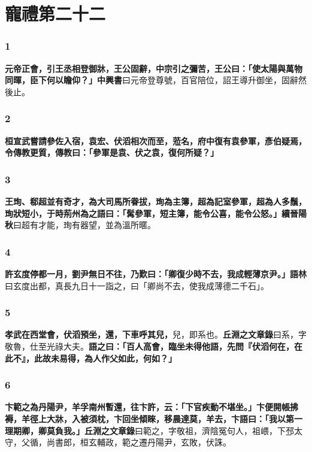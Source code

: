 \chapter{寵禮第二十二}

\subsection*{1}

\textbf{元帝正會，引王丞相登御牀，王公固辭，中宗引之彌苦，王公曰：「使太陽與萬物同暉，臣下何以瞻仰？」}{\footnotesize \textbf{中興書}曰元帝登尊號，百官陪位，詔王導升御坐，固辭然後止。}

\subsection*{2}

\textbf{桓宣武嘗請參佐入宿，袁宏、伏滔相次而至，蒞名，府中復有袁參軍，彥伯疑焉，令傳教更質，傳教曰：「參軍是袁、伏之袁，復何所疑？」}

\subsection*{3}

\textbf{王珣、郗超並有奇才，為大司馬所眷拔，珣為主簿，超為記室參軍，超為人多鬚，珣狀短小，于時荊州為之語曰：「髯參軍，短主簿，能令公喜，能令公怒。」}{\footnotesize \textbf{續晉陽秋}曰超有才能，珣有器望，並為溫所暱。}

\subsection*{4}

\textbf{許玄度停都一月，劉尹無日不往，乃歎曰：「卿復少時不去，我成輕薄京尹。」}{\footnotesize \textbf{語林}曰玄度出都，真長九日十一詣之，曰「卿尚不去，使我成薄德二千石」。}

\subsection*{5}

\textbf{孝武在西堂會，伏滔預坐，還，下車呼其兒，}{\footnotesize 兒，即系也。\textbf{丘淵之文章錄}曰系，字敬魯，仕至光祿大夫。}\textbf{語之曰：「百人高會，臨坐未得他語，先問『伏滔何在，在此不』，此故未易得，為人作父如此，何如？」}

\subsection*{6}

\textbf{卞範之為丹陽尹，羊孚南州暫還，往卞許，云：「下官疾動不堪坐。」卞便開帳拂褥，羊徑上大牀，入被須枕，卞回坐傾睞，移晨達莫，羊去，卞語曰：「我以第一理期卿，卿莫負我。」}{\footnotesize \textbf{丘淵之文章錄}曰範之，字敬祖，濟陰冤句人，祖㟪，下邳太守，父循，尚書郎，桓玄輔政，範之遷丹陽尹，玄敗，伏誅。}